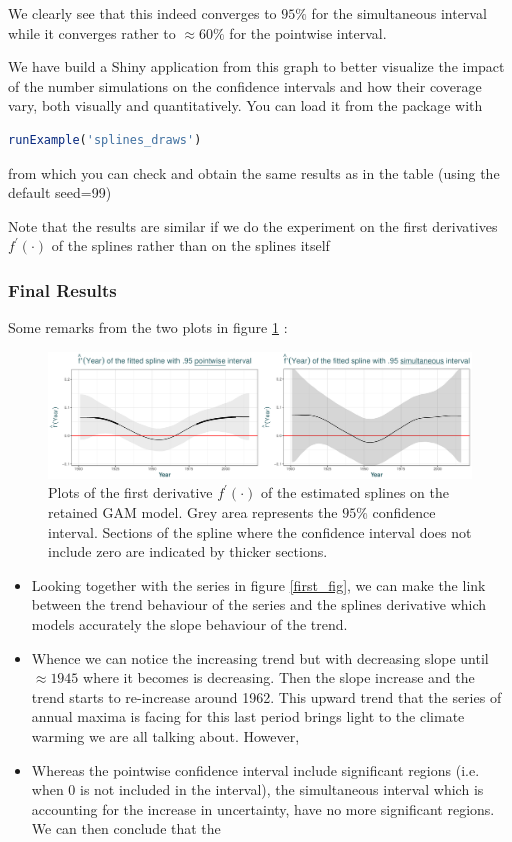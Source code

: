 We clearly see that this indeed converges to $95\%$ for the simultaneous interval while it converges rather to $\approx 60\%$ for the pointwise interval.

We have build a Shiny application from this graph to better visualize the impact of the number simulations on the confidence intervals and how their coverage vary, both visually and quantitatively. You can load it from the package with \begin{lstlisting}[language=R]
runExample('splines_draws')\end{lstlisting} from which you can check and obtain the same results as in the table (using the default seed=99)

Note that the results are similar if we do the experiment on the first derivatives $f^{'}(\cdot)$ of the splines rather than on the splines itself


\subsubsection*{Final Results}


Some remarks from the two plots in figure \ref{fig:derivsplines} :

\begin{figure}[!htb]
	\includegraphics[width=.99\linewidth]{splines.pdf}\caption{Plots of the first derivative $f^{'}(\cdot)$ of the estimated splines on the retained GAM model. Grey area represents the $95\%$ confidence interval. Sections of the spline where the confidence interval does not include zero are indicated by thicker sections. }\label{fig:derivsplines}
\end{figure}

\begin{itemize}
\item Looking together with the series in figure \ref{first_fig}, we can make the link between the trend behaviour of the series and the splines derivative which models accurately the slope behaviour of the trend. 
\item Whence we can notice the increasing trend but with decreasing slope until $\approx 1945$ where it becomes is decreasing. Then the slope increase and the trend starts to re-increase around 1962. This upward trend that the series of annual maxima is facing for this last period brings light to the climate warming we are all talking about. However, 
\item  Whereas the pointwise confidence interval include significant regions (i.e. when 0 is not included in the interval), the simultaneous interval which is accounting for the increase in uncertainty, have no more significant regions. We can then conclude that the 

\end{itemize}


